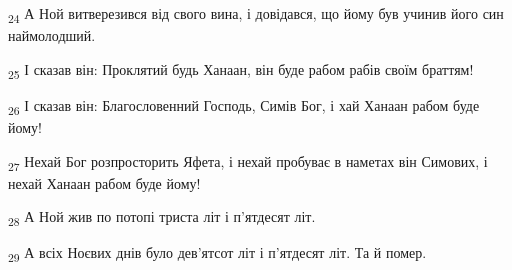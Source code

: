 \begin{tcolorbox}
\textsubscript{24} А Ной витверезився від свого вина, і довідався, що йому був учинив його син наймолодший.
\end{tcolorbox}
\begin{tcolorbox}
\textsubscript{25} І сказав він: Проклятий будь Ханаан, він буде рабом рабів своїм браттям!
\end{tcolorbox}
\begin{tcolorbox}
\textsubscript{26} І сказав він: Благословенний Господь, Симів Бог, і хай Ханаан рабом буде йому!
\end{tcolorbox}
\begin{tcolorbox}
\textsubscript{27} Нехай Бог розпросторить Яфета, і нехай пробуває в наметах він Симових, і нехай Ханаан рабом буде йому!
\end{tcolorbox}
\begin{tcolorbox}
\textsubscript{28} А Ной жив по потопі триста літ і п'ятдесят літ.
\end{tcolorbox}
\begin{tcolorbox}
\textsubscript{29} А всіх Ноєвих днів було дев'ятсот літ і п'ятдесят літ. Та й помер.
\end{tcolorbox}
